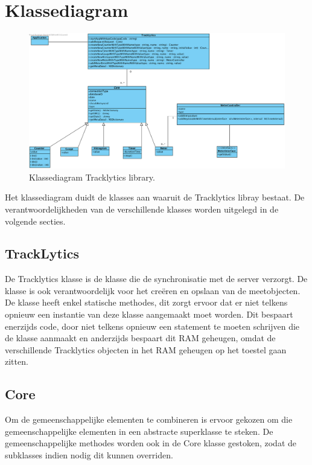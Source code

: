 \section{Klassediagram} \label{sec:Klassediagram}
\begin{figure}[!h]
  \centering
  \includegraphics[scale=0.4]{Afbeeldingen/Implementatie/ClassDiagram}
  \caption{Klassediagram Tracklytics library.}
  \label{fig:fig}
\end{figure}

Het klassediagram duidt de klasses aan waaruit de Tracklytics libray bestaat. De verantwoordelijkheden van de verschillende klasses worden uitgelegd in de volgende secties.

\subsection{TrackLytics}
De Tracklytics klasse is de klasse die de synchronisatie met de server verzorgt. De klasse is ook verantwoordelijk voor het creëren en opslaan van de meetobjecten. De klasse heeft enkel statische methodes, dit zorgt ervoor dat er niet telkens opnieuw een instantie van deze klasse aangemaakt moet worden. Dit bespaart enerzijds code, door niet telkens opnieuw een statement te moeten schrijven die de klasse aanmaakt en anderzijds bespaart dit RAM geheugen, omdat de verschillende Tracklytics objecten in het RAM geheugen op het toestel gaan zitten.

\subsection{Core}
Om de gemeenschappelijke elementen te combineren is ervoor gekozen om die gemeenschappelijke elementen in een abstracte superklasse te steken. De gemeenschappelijke methodes worden ook in de Core klasse gestoken, zodat de subklasses indien nodig dit kunnen overriden. 

